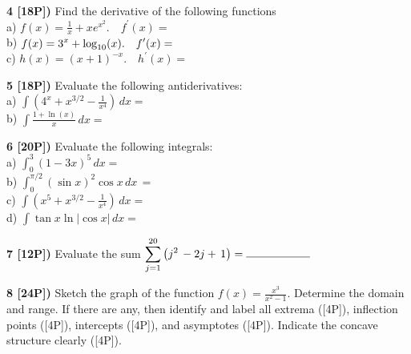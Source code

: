 \documentclass[12pt]{article}
\begin{document}
\vspace{.25in}

{\bf 4 [18P])} Find the derivative of the following functions\\

a) ${\displaystyle f(x) = \frac{1}{x} + xe^{x^2}. \quad f^\prime (x) = }$
\\

b) ${\displaystyle f(x) =  3^x + {\rm log}_{10}(x). \quad
f^\prime (x) = }$
\\

c)  ${\displaystyle h(x) =  (x+1)^{-x} . \quad
h^\prime (x) = }$


\vspace{.25in}

{\bf 5 [18P])}  Evaluate the following antiderivatives:
\\ %
a) 
$\displaystyle{\int \left( 4^x + x^{3/2} - \frac{1}{x^4}
\right)\, dx =}$
\\

b) $\displaystyle{\int \frac{1 + \ln (x)}{x} \, dx=}$

\vspace{.25in}

{\bf 6 [20P])} Evaluate the following integrals:
\\ %

a)  $\displaystyle{\int_{0}^3 (1 - 3x)^5\, dx =}$
\\

b) ${ \int_0^{\pi /2} (\sin x)^2 \cos x\, dx\, = }$
\\

c) 
$\displaystyle{\int \left( x^5 + x^{3/2} - \frac{1}{x^4}
\right)\, dx =}$
\\ %

d) $\displaystyle{\int \tan x \ln |\cos x| \, dx=}$
\vspace{.25in}

{\bf 7 [12P])} Evaluate the sum $ 
\displaystyle{\sum_{j=1}^{20}\left( j^2\,-2j  +\, 1\right) =
\hbox  to 2cm{\hrulefill}}$

\vspace{.25in}%

{\bf 8 [24P])} Sketch the graph of the function
${\displaystyle f(x) = \frac{x^3}{x^2-1}}$. Determine the domain and
range. If there are any, then identify and label all
extrema ([4P]), inflection points ([4P]), intercepts
([4P]), and asymptotes ([4P]). Indicate the concave structure
clearly ([4P]).
\end{document}
